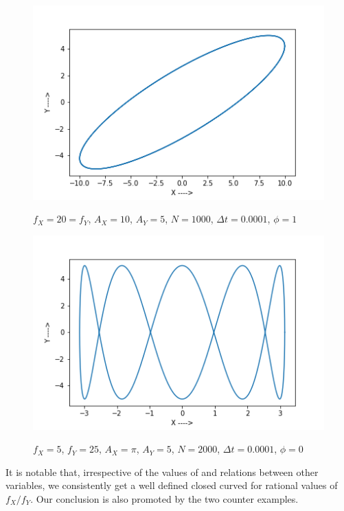 \documentclass{report}
\begin{document}
\begin{figure}[H]
	\centering
	\includegraphics[width = \textwidth]{amp105.png}
	\label{amp1}
	\caption{$f_X=20=f_Y$, $A_X=10$, $A_Y=5$, $N=1000$, $\Delta t=0.0001$, $\phi=1$}
\end{figure}

\begin{figure}[H]
	\centering
	\includegraphics[width = \textwidth]{amp_pi.png}
	\label{phase1}
	\caption{$f_X=5$, $f_Y=25$, $A_X=\pi$, $A_Y=5$, $N=2000$, $\Delta t=0.0001$, $\phi=0$}
\end{figure}
It is notable that, irrespective of the values of and relations between other variables, we consistently get a well defined closed curved for rational values of $f_X/f_Y$. Our conclusion is also promoted by the two counter examples.
\end{document}
